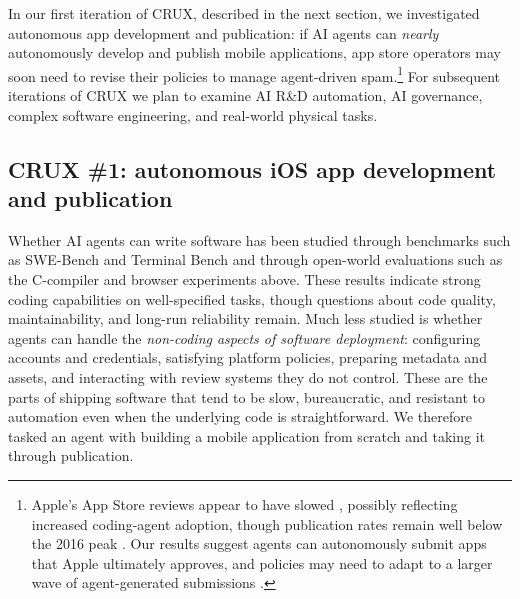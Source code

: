 \documentclass{article}
\begin{document}
In our first iteration of CRUX, described in the next section, we investigated autonomous app development and publication: if AI agents can \emph{nearly} autonomously develop and publish mobile applications, app store operators may soon need to revise their policies to manage agent-driven spam.\footnote{Apple's App Store reviews appear to have slowed \citep{9to5macCom29Vibe,xnikitabier2033931821260648659}, possibly reflecting increased coding-agent adoption, though publication rates remain well below the 2016 peak \citep{appfiguresComInsights20251205}. Our results suggest agents can autonomously submit apps that Apple ultimately approves, and policies may need to adapt to a larger wave of agent-generated submissions \citep{fastcompanyCom91522242Apple}.} For subsequent iterations of CRUX we plan to examine AI R\&D automation, AI governance, complex software engineering, and real-world physical tasks.


\vspace{0pt}
\subsection{CRUX \#1: autonomous iOS app development and publication}\label{crux-1-can-ai-agents-autonomously-develop-and-publish-an-ios-app}

Whether AI agents can write software has been studied through benchmarks such as SWE-Bench \citep{arxivabs231006770} and Terminal Bench \citep{tbenchAi} and through open-world evaluations such as the C-compiler and browser experiments above. These results indicate strong coding capabilities on well-specified tasks, though questions about code quality, maintainability, and long-run reliability remain. Much less studied is whether agents can handle the \emph{non-coding aspects of software deployment}: configuring accounts and credentials, satisfying platform policies, preparing metadata and assets, and interacting with review systems they do not control. These are the parts of shipping software that tend to be slow, bureaucratic, and resistant to automation even when the underlying code is straightforward. We therefore tasked an agent with building a mobile application from scratch and taking it through publication.
\end{document}
